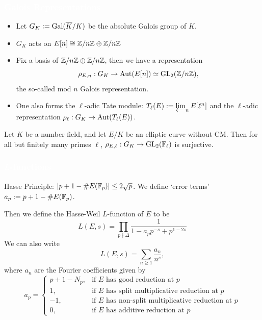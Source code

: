 \begin{frame}[plain]
\frametitle{\textcolor{white}{Galois Representations}}

\begin{itemize}
\item Let $G_K:= \operatorname{Gal}(\overline{K}/K)$ be the absolute Galois group of $K$. 

\item $G_K$ acts on $E[n] \cong \mathbb{Z}/n\mathbb{Z} \oplus \mathbb{Z}/n\mathbb{Z}$

\item Fix a basis of $\mathbb{Z}/n\mathbb{Z} \oplus \mathbb{Z}/n\mathbb{Z}$, then we have a representation
	\[
	\rho_{E,n}: G_K \to \operatorname{Aut}(E[n]) \simeq \operatorname{GL}_2(\mathbb{Z}/n\mathbb{Z}),
	\]
the so-called mod $n$ Galois representation. 

\item One also forms the $\ell$-adic Tate module: $T_\ell(E):= \varprojlim_n E[\ell^n]$ and the $\ell$-adic representation $\rho_\ell: G_K \to \operatorname{Aut}(T_\ell(E))$. 
\end{itemize}

\begin{thm}[Serre]
Let $K$ be a number field, and let $E/K$ be an elliptic curve without CM. Then for all but finitely many primes $\ell$, $\rho_{E,\ell}: G_K \to \operatorname{GL}_2(\mathbb{F}_\ell)$ is surjective. 
\end{thm}
\end{frame}



\begin{frame}[plain]
\frametitle{\textcolor{white}{$L$-functions}}

Hasse Principle: $|p+1- \#E(\mathbb{F}_p)| \leq 2 \sqrt{p}$. We define `error terms' $a_p:= p + 1 - \#E(\mathbb{F}_p)$.  \par \vspace{0.5cm}

Then we define the Hasse-Weil $L$-function of $E$ to be
	\[
	L(E,s)= \prod_{p \nmid \Delta} \dfrac{1}{1 - a_p p^{-s} + p^{1-2s}}
	\] 
We can also write
	\[
	L(E,s)= \sum_{n \geq 1} \dfrac{a_n}{n^s},
	\]
where $a_n$ are the Fourier coefficients given by
	\[
	a_p=
	\begin{cases}
	p+1-N_p, & \text{if } E \text{ has good reduction at } p \\
	1, & \text{if } E \text{ has split multiplicative reduction at } p \\
	-1, & \text{if } E \text{ has non-split multiplicative reduction at } p \\
	0, & \text{if } E \text{ has additive reduction at } p
	\end{cases}
	\]
\end{frame}



